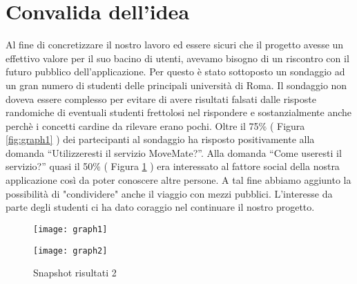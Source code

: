 \section{Convalida dell'idea}
Al fine di concretizzare il nostro lavoro ed essere sicuri che il progetto avesse un effettivo valore per il suo bacino di utenti, avevamo bisogno di un riscontro con il futuro pubblico dell’applicazione. Per questo è stato sottoposto un sondaggio ad un gran numero di studenti delle principali università di Roma.
Il sondaggio non doveva essere complesso per evitare di avere risultati falsati dalle risposte randomiche di eventuali studenti frettolosi nel rispondere e sostanzialmente anche perchè i concetti cardine da rilevare erano pochi.
Oltre il 75\% ( Figura \ref{fig:graph1} ) dei partecipanti al sondaggio ha risposto positivamente alla domanda “Utilizzeresti il servizio MoveMate?”.
Alla domanda “Come useresti il servizio?” quasi il 50\% ( Figura \ref{fig:graph2} ) era interessato al fattore social della nostra applicazione così da poter conoscere altre persone.
A tal fine abbiamo aggiunto la possibilità di "condividere" anche il viaggio con mezzi pubblici.
L’interesse da parte degli studenti ci ha dato coraggio nel continuare il nostro progetto.

\begin{figure}[!h]
\begin{minipage}{\linewidth}
  \centering
    \texttt{[image: graph1]}
  \caption{Snapshot risultati 1}
  \label{fig:graph1}
\vspace{1cm}
  \centering
    \texttt{[image: graph2]}
  \caption{Snapshot risultati 2}
  \label{fig:graph2}
\end{minipage}
\end{figure}

\FloatBarrier


